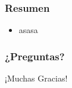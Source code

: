 \documentclass[serif,9pt]{beamer}
\begin{document}
\begin{frame}
	\frametitle{Resumen}	
	\begin{itemize}
		\item asasa
	\end{itemize}
\end{frame}

\begin{frame}
	\frametitle{¿Preguntas?}
	¡Muchas Gracias!	
\end{frame}



\end{document}
